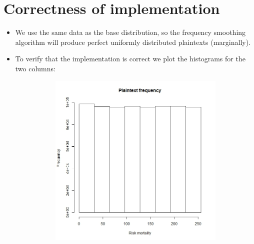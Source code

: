 \documentclass{article}
\begin{document}
\section{Correctness of implementation}
\begin{itemize}
	\item We use the same data as the base distribution, so the frequency smoothing algorithm will produce perfect uniformly distributed plaintexts (marginally).
	
	\item To verify that the implementation is correct we plot the histograms for the two columns:
	\begin{figure}[H]
		\centering
		\begin{subfigure}{.45\textwidth}
			\centering
			\includegraphics[width=1\linewidth]{./Img/img1.jpeg}
		\end{subfigure} %
		\begin{subfigure}{.45\textwidth}
			\centering

\end{subfigure}
\end{figure}
\end{itemize}
\end{document}
